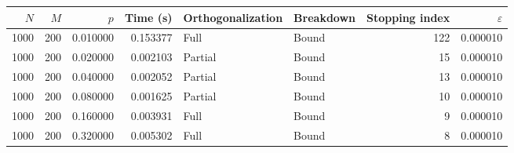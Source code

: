 \begin{tabular}{rrrrllrr}
\toprule
$N$ & $M$ & $p$ & Time (s) & Orthogonalization & Breakdown & Stopping index & $\varepsilon$ \\
\midrule
1000 & 200 & 0.010000 & 0.153377 & Full & Bound & 122 & 0.000010 \\
1000 & 200 & 0.020000 & 0.002103 & Partial & Bound & 15 & 0.000010 \\
1000 & 200 & 0.040000 & 0.002052 & Partial & Bound & 13 & 0.000010 \\
1000 & 200 & 0.080000 & 0.001625 & Partial & Bound & 10 & 0.000010 \\
1000 & 200 & 0.160000 & 0.003931 & Full & Bound & 9 & 0.000010 \\
1000 & 200 & 0.320000 & 0.005302 & Full & Bound & 8 & 0.000010 \\
\bottomrule
\end{tabular}
